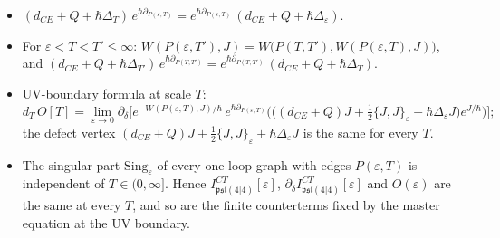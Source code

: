\begin{lemma}
\label{lem:o-Tflow}
\begin{itemize}
\item[(i)] $(d_{CE}+Q+\hbar\Delta_T)\,e^{\hbar\partial_{P(\varepsilon,T)}}=e^{\hbar\partial_{P(\varepsilon,T)}}\,(d_{CE}+Q+\hbar\Delta_\varepsilon)$.
\item[(ii)] For $\varepsilon<T<T'\le\infty$: $W(P(\varepsilon,T'),J)=W\big(P(T,T'),W(P(\varepsilon,T),J)\big)$, and $(d_{CE}+Q+\hbar\Delta_{T'})\,e^{\hbar\partial_{P(T,T')}}=e^{\hbar\partial_{P(T,T')}}\,(d_{CE}+Q+\hbar\Delta_T)$.
\item[(iii)] UV-boundary formula at scale $T$:
\[
d_T\,O[T]=\lim_{\varepsilon\to0}\partial_\delta\Big[e^{-W(P(\varepsilon,T),J)/\hbar}\,e^{\hbar\partial_{P(\varepsilon,T)}}\Big(\big((d_{CE}+Q)J+\tfrac12\{J,J\}_\varepsilon+\hbar\Delta_\varepsilon J\big)e^{J/\hbar}\Big)\Big];
\]
the defect vertex $(d_{CE}+Q)J+\tfrac12\{J,J\}_\varepsilon+\hbar\Delta_\varepsilon J$ is the same for every $T$.
\item[(iv)] The singular part $\mathrm{Sing}_\varepsilon$ of every one-loop graph with edges $P(\varepsilon,T)$ is independent of $T\in(0,\infty]$. Hence $I^{CT}_{\mathfrak{psl}(4|4)}[\varepsilon]$, $\partial_\delta I^{CT}_{\mathfrak{psl}(4|4)}[\varepsilon]$ and $O(\varepsilon)$ are the same at every $T$, and so are the finite counterterms fixed by the master equation at the UV boundary.
\end{itemize}
\end{lemma}

